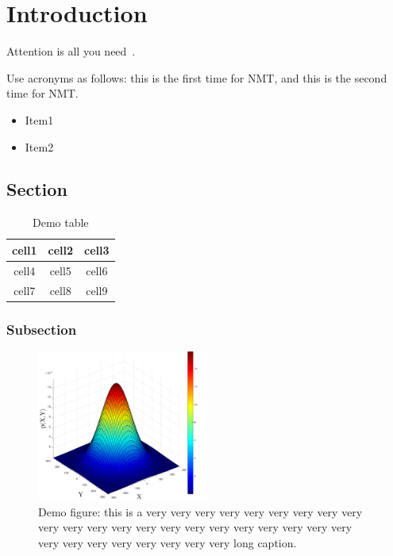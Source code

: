 
\chapter{Introduction}

Attention is all you need~\cite{vaswani2017attention}.

Use acronyms as follows: this is the first time for \ac{NMT}, and this is the
second time for \ac{NMT}.

\begin{itemize}
    \item Item1
    \item Item2
\end{itemize}

\lipsum[1-2]

\section{Section}

\lipsum[1-2]

\begin{table}[htb]
    \centering
    \caption{Demo table}
    \begin{tabular}{c|c|c}
        cell1 & cell2 & cell3 \\ 
        \hline
        cell4 & cell5 & cell6 \\ 
        cell7 & cell8 & cell9
    \end{tabular}
\end{table}

\subsection{Subsection}

\lipsum[1-2]

\begin{figure}[htb]
    \centering
    \includegraphics[width=0.5\textwidth]{fig/demo}
    \caption[
    Demo figure: short version
    ]{
        Demo figure: this is a very very very very very very very very very
        very very very very very very very very very very very very very very
        very very very very very very very long caption.
    }
\end{figure}
